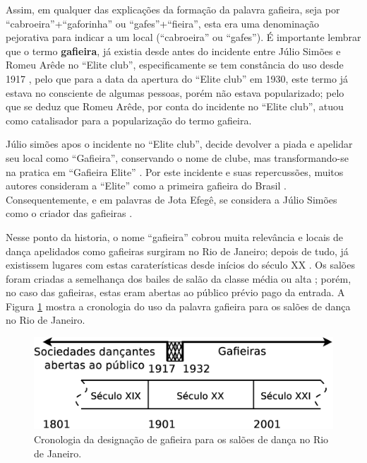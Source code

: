 Assim, em qualquer das explicações da formação da palavra gafieira,
seja por ``cabroeira''+``gaforinha'' ou ``gafes''+``fieira'',
esta era uma denominação pejorativa para indicar a um local (``cabroeira'' ou ``gafes'').
É importante lembrar que o termo \textbf{gafieira}, já existia desde antes do 
incidente entre Júlio Simões e Romeu Arêde no ``Elite club'', 
especificamente se tem constância do uso desde 1917 \cite[pp. 4]{oldgafieira1},
pelo que para a data da apertura do ``Elite club'' em 1930,
este termo já estava no consciente de algumas pessoas, porém não estava popularizado;
pelo que se deduz que Romeu Arêde, por conta do incidente no ``Elite club'', 
atuou como catalisador para a popularização do termo gafieira.

Júlio simões apos o incidente no ``Elite club'', 
decide devolver a piada e apelidar seu local como 
``Gafieira'', conservando o nome de clube, 
mas transformando-se na pratica em ``Gafieira Elite'' \cite[pp. 79]{moura1995tia} \cite[pp. 6 - Tribuna Bis]{gafieiraaredeout3}.
Por este incidente e suas repercussões, 
muitos autores consideram a ``Elite'' como a primeira gafieira do Brasil \cite{cabral2016elisete} \cite[pp. 84]{cabral1996escolas}.
Consequentemente, e em palavras de Jota Efegê, 
se considera a Júlio Simões como o criador das gafieiras \cite[pp. 3 - cad. 3]{juliosimoes}.

Nesse ponto da historia, 
o nome ``gafieira'' cobrou muita relevância e locais de dança apelidados como gafieiras surgiram no Rio de Janeiro;
depois de tudo, já existissem lugares com estas caraterísticas desde inícios do século XX \cite[pp. 49]{diniz2003almanaque}.
Os salões foram criadas a semelhança dos bailes de salão da classe média ou alta \cite[pp. 78]{coutinho2006cronistas}; 
porém, no caso das gafieiras, estas eram abertas ao público prévio pago da entrada.
A Figura \ref{fig:gafieiracrono} mostra a cronologia do uso da palavra gafieira para os salões de dança no Rio de Janeiro.
\begin{figure}[h]
  \centering
    \includegraphics[width=1.0\textwidth]{chapters/cap-historia-gafieiras/gafieira-crono.eps}
  \caption{Cronologia da designação de gafieira para os salões de dança no Rio de Janeiro.}
  \label{fig:gafieiracrono}
\end{figure}

